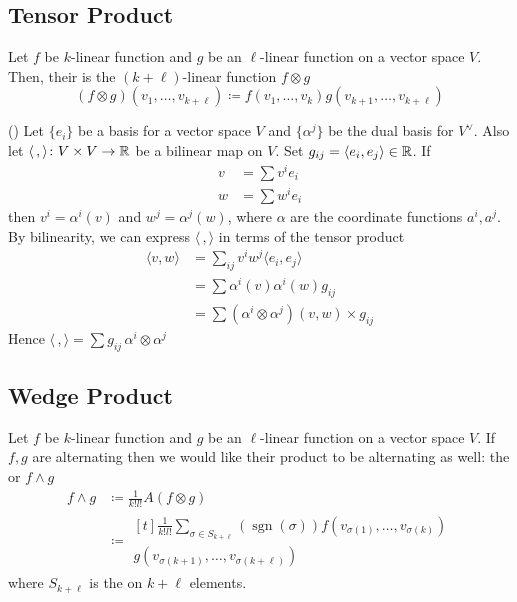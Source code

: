 \subsection{Tensor Product}

Let \(f\) be \(k\)-linear function and \(g\) be an \(\ell\)-linear function on a vector space \(V\). Then, their  is the \((k+\ell)\)-linear function \(f\otimes g\)
\begin{equation}
    (f \otimes g) (v_1, \dots, v_{k+\ell}) \coloneqq f(v_1, \dots, v_k)g(v_{k+1}, \dots, v_{k+\ell})
\end{equation}

\begin{example}
    () Let \(\{e_i\}\) be a basis for a vector space \(V\) and \(\{\alpha^j\}\) be the dual basis for \(V^\vee\). Also let \(\langle\,,\rangle\colon V \times V \rightarrow \mathbb{R}\) be a bilinear map on \(V\). Set \(g_{ij} = \langle e_i, e_j \rangle\in \mathbb{R}\). If
    \begin{align}
        v & = \sum v^i e_i \\
        w & = \sum w^i e_i
    \end{align}
    then \(v^i = \alpha^i(v)\) and \(w^j = \alpha^j(w)\), where \(\alpha\) are the coordinate functions \(a^i, a^j\). By bilinearity, we can express \(\langle\,,\rangle\) in terms of the tensor product
    \begin{equation}
        \begin{split}
            \langle v,w \rangle &= \sum_{ij} v^i w^j \langle e_i, e_j\rangle \\
            &= \sum \alpha^i(v) \alpha^i(w) g_{ij} \\
            &= \sum (\alpha^i \otimes \alpha^j)(v,w) \times g_{ij}
        \end{split}
    \end{equation}
    Hence \(\langle\,,\rangle = \sum g_{ij}\, \alpha^i \otimes \alpha^j\)
\end{example}

\subsection{Wedge Product}

Let \(f\) be \(k\)-linear function and \(g\) be an \(\ell\)-linear function on a vector space \(V\).
If  \(f,g\) are alternating then we would like their product to be alternating as well: the  or  \(f \wedge g\)
\begin{align}
    f \wedge g & \coloneqq \frac{1}{k!l!}  A(f \otimes g) \\
               & \coloneqq 
               \begin{multlined}[t]
                    \frac{1}{k!l!}  \sum_{\sigma \in S_{k+\ell}} (\operatorname{sgn}(\sigma)) f(v_{\sigma(1)}, \dots, v_{\sigma(k)}) \\ 
                    g(v_{\sigma(k+1)}, \dots, v_{\sigma(k+\ell)})
                \end{multlined}
\end{align}
where \(S_{k+\ell}\) is the  on \(k+\ell\) elements.

